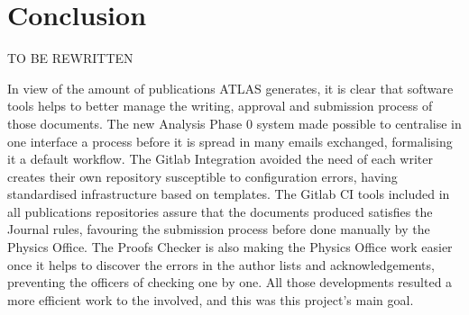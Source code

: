 \section*{Conclusion}
\label{sec:Conclusion}
TO BE REWRITTEN


In view of the amount of publications ATLAS generates, it is clear that software tools helps to better manage the writing, approval and submission process of those documents. The new Analysis Phase 0 system made possible to centralise in one interface a process before it is spread in many emails exchanged, formalising it a default workflow. The Gitlab Integration avoided the need of each writer creates their own repository susceptible to configuration errors, having standardised infrastructure based on templates. The Gitlab CI tools included in all publications repositories assure that the documents produced satisfies the Journal rules, favouring the submission process before done manually by the Physics Office. The Proofs Checker is also making the Physics Office work easier once it helps to discover the errors in the author lists and acknowledgements, preventing the officers of checking one by one. All those developments resulted a more efficient work to the involved, and this was this project's main goal.

